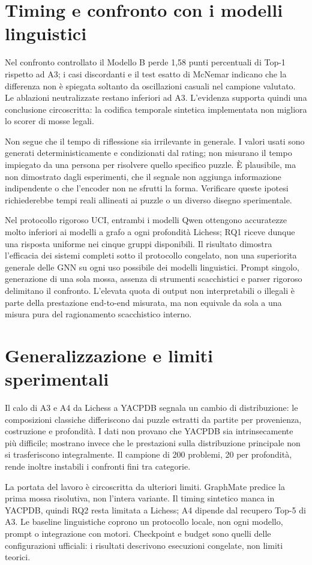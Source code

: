 \section{Timing e confronto con i modelli linguistici}

Nel confronto controllato il Modello B perde 1,58 punti percentuali di Top-1
rispetto ad A3; i casi discordanti e il test esatto di McNemar indicano che la
differenza non è spiegata soltanto da oscillazioni casuali nel campione valutato.
Le ablazioni neutralizzate restano inferiori ad A3. L'evidenza supporta quindi una
conclusione circoscritta: la codifica temporale sintetica implementata non migliora
lo scorer di mosse legali.

Non segue che il tempo di riflessione sia irrilevante in generale. I valori usati
sono generati deterministicamente e condizionati dal rating; non misurano il tempo
impiegato da una persona per risolvere quello specifico puzzle. È plausibile, ma non
dimostrato dagli esperimenti, che il segnale non aggiunga informazione indipendente
o che l'encoder non ne sfrutti la forma. Verificare queste ipotesi richiederebbe
tempi reali allineati ai puzzle o un diverso disegno sperimentale.

Nel protocollo rigoroso UCI, entrambi i modelli Qwen ottengono accuratezze molto
inferiori ai modelli a grafo a ogni profondità Lichess; RQ1 riceve dunque una
risposta uniforme nei cinque gruppi disponibili. Il risultato dimostra l'efficacia
dei sistemi completi sotto il protocollo congelato, non una superiorita generale
delle GNN su ogni uso possibile dei modelli linguistici. Prompt singolo, generazione
di una sola mossa, assenza di strumenti scacchistici e parser rigoroso delimitano il
confronto. L'elevata quota di output non interpretabili o illegali è parte della
prestazione end-to-end misurata, ma non equivale da sola a una misura pura del
ragionamento scacchistico interno.

\section{Generalizzazione e limiti sperimentali}

Il calo di A3 e A4 da Lichess a YACPDB segnala un cambio di distribuzione: le
composizioni classiche differiscono dai puzzle estratti da partite per provenienza,
costruzione e profondità. I dati non provano che YACPDB sia intrinsecamente più
difficile; mostrano invece che le prestazioni sulla distribuzione principale non si
trasferiscono integralmente. Il campione di 200 problemi, 20 per profondità, rende
inoltre instabili i confronti fini tra categorie.

La portata del lavoro è circoscritta da ulteriori limiti. GraphMate predice la
prima mossa risolutiva, non l'intera variante. Il timing sintetico manca in YACPDB,
quindi RQ2 resta limitata a Lichess; A4 dipende dal recupero Top-5 di A3. Le
baseline linguistiche coprono un protocollo locale, non ogni modello, prompt o
integrazione con motori. Checkpoint e budget sono quelli delle configurazioni
ufficiali: i risultati descrivono esecuzioni congelate, non limiti teorici.
